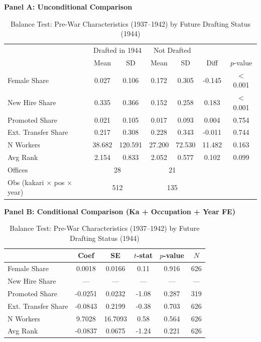 \begin{table}[htbp]
\centering
\caption{Balance Test: Pre-War Characteristics (1937--1942) by Future Drafting Status (1944)}
\label{tab:balance}
\small
\begin{threeparttable}

\textbf{Panel A: Unconditional Comparison}
\medskip

\begin{tabular}{lcccccc}
\toprule
 & \multicolumn{2}{c}{Drafted in 1944} & \multicolumn{2}{c}{Not Drafted} & & \\
 & Mean & SD & Mean & SD & Diff & $p$-value \\
\midrule
Female Share & 0.027 & 0.106 & 0.172 & 0.305 & -0.145 & $<$0.001 \\
New Hire Share & 0.335 & 0.366 & 0.152 & 0.258 & 0.183 & $<$0.001 \\
Promoted Share & 0.021 & 0.105 & 0.017 & 0.093 & 0.004 & 0.754 \\
Ext. Transfer Share & 0.217 & 0.308 & 0.228 & 0.343 & -0.011 & 0.744 \\
N Workers & 38.682 & 120.591 & 27.200 & 72.530 & 11.482 & 0.163 \\
Avg Rank & 2.154 & 0.833 & 2.052 & 0.577 & 0.102 & 0.099 \\
\midrule
Offices & \multicolumn{2}{c}{28} & \multicolumn{2}{c}{21} & & \\
Obs (kakari $\times$ pos $\times$ year) & \multicolumn{2}{c}{512} & \multicolumn{2}{c}{135} & & \\
\bottomrule
\end{tabular}

\bigskip

\textbf{Panel B: Conditional Comparison (Ka + Occupation + Year FE)}
\medskip

\begin{tabular}{lccccc}
\toprule
 & Coef & SE & $t$-stat & $p$-value & $N$ \\
\midrule
Female Share & 0.0018 & 0.0166 & 0.11 & 0.916 & 626 \\
New Hire Share & --- & --- & --- & --- & --- \\
Promoted Share & -0.0251 & 0.0232 & -1.08 & 0.287 & 319 \\
Ext. Transfer Share & -0.0843 & 0.2199 & -0.38 & 0.703 & 626 \\
N Workers & 9.7028 & 16.7093 & 0.58 & 0.564 & 626 \\
Avg Rank & -0.0837 & 0.0675 & -1.24 & 0.221 & 626 \\
\bottomrule
\end{tabular}


\end{threeparttable}
\end{table}
